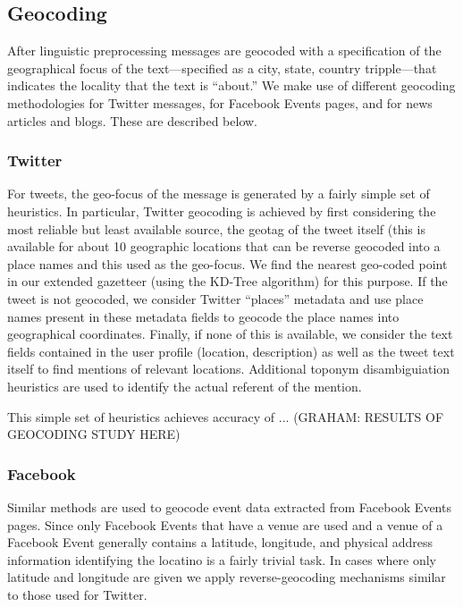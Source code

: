 \subsection{Geocoding}
\label{subsection:geocoding}

After linguistic preprocessing messages are geocoded with a
specification of the geographical focus of the text---specified as a
city, state, country tripple---that indicates the locality that the
text is ``about.'' We make use of different geocoding methodologies
for Twitter messages, for Facebook Events pages, and for news articles and blogs.
These are described below.


\subsubsection{Twitter}

For tweets, the geo-focus of the message is generated by a fairly
simple set of heuristics.  In particular, Twitter
geocoding is achieved by first considering the most reliable but least
available source, the geotag of the tweet itself (this is available
for about 10%
geographic locations that can be reverse geocoded into a place names
and this used as the geo-focus. We find the nearest geo-coded point in
our extended gazetteer (using the KD-Tree algorithm) for this
purpose. If the tweet is not geocoded, we consider Twitter ``places''
metadata and use place names present in these metadata fields to
geocode the place names into geographical coordinates.  Finally, if
none of this is available, we consider the text fields contained in
the user profile (location, description) as well as the tweet text
itself to find mentions of relevant locations.  Additional toponym disambiguiation heuristics are used to
identify the actual referent of the mention.

This simple set of heuristics achieves accuracy of ... 
(GRAHAM: RESULTS OF GEOCODING STUDY HERE)

\subsubsection{Facebook}
Similar methods are used to geocode event data extracted from Facebook Events pages.   Since only Facebook Events that have a venue are used and a venue of a Facebook Event generally contains a latitude, longitude, and physical address information identifying the locatino is a fairly trivial task.  In cases where only latitude and longitude are given we apply reverse-geocoding mechanisms similar to those used for Twitter.


